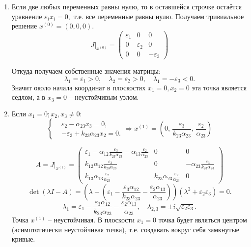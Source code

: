     \begin{enumerate}
        \item Если две любых переменных равны нулю, то в оставшейся строчке остаётся уравнение \( \varepsilon_i x_i = 0, \) т.е. все переменные равны нулю. Получаем тривиальное решение \( x^{(0)} = (0,0,0) \).
        \[
            J \big|_{x^{(0)}} = \left(\begin{matrix}
                \varepsilon_1 & 0 & 0 \\
                0 & \varepsilon_2 & 0 \\
                0 & 0  & -\varepsilon_3
            \end{matrix}\right)
        \]

        Откуда получаем собственные значения матрицы: 
        \[
            \lambda_1 = \varepsilon_1 > 0, \quad \lambda_2 = \varepsilon_2 > 0, \quad \lambda_1 = -\varepsilon_3 < 0.
        \]
        Значит около начала координат в плоскостях \( x_1 = 0, x_2 = 0 \) эта точка является седлом, а в \( x_3 = 0 \) -- неустойчивым узлом.
        \item Если \( x_1 = 0; x_2, x_3 \neq 0 \):
            \[
                \left\{\begin{split}
                    & \varepsilon_2 - \alpha_{23} x_3 = 0, \\
                    & -\varepsilon_3 + k_{23} \alpha_{23} x_2 = 0. 
                \end{split}\right.
                \Rightarrow
                x^{(1)} = \left( 0,\, \frac{\varepsilon_3}{k_{23} \alpha_{23}},\, \frac{\varepsilon_2}{\alpha_{23}} \right)
            \]

            \[
                A = J \big|_{x^{(1)}} = \left(\begin{matrix}
                    \varepsilon_1 - \alpha_{12} \frac{\varepsilon_3}{k_{23} \alpha_{23}} - \alpha_{13} \frac{\varepsilon_2}{\alpha_{23}} & 0 & 0 \\[10pt]
                    k_{12} \alpha_{12} \frac{\varepsilon_3}{k_{23} \alpha_{23}} & 0 & -\alpha_{23} \frac{\varepsilon_3}{k_{23} \alpha_{23}} \\[10pt]
                    k_{13} \alpha_{13} \frac{\varepsilon_2}{\alpha_{23}} & k_{23} \alpha_{23} \frac{\varepsilon_2}{\alpha_{23}}  & 0
                \end{matrix}\right)
            \]
            \[
                \det(\lambda I - A) = \left(\lambda - \left(\varepsilon_1 - \frac{\varepsilon_3 \alpha_{12} }{k_{23} \alpha_{23}} - \frac{\varepsilon_2 \alpha_{13}}{\alpha_{23}} \right) \right)(\lambda^2 + \varepsilon_2 \varepsilon_3) = 0.
            \]
            \[
                \lambda_1 = \varepsilon_1 - \frac{\varepsilon_3 \alpha_{12} }{k_{23} \alpha_{23}} - \frac{\varepsilon_2 \alpha_{13}}{\alpha_{23}} , \quad \lambda_{2,3} = \pm i \sqrt{\varepsilon_2 \varepsilon_3}.
            \]
            Точка \( x^{(1)} \) -- неустойчивая. В плоскости \( x_1 = 0 \) точка будет являться центром (асимптотически неустойчивая точка), т.е. создавать вокруг себя замкнутые кривые.


\end{enumerate}
